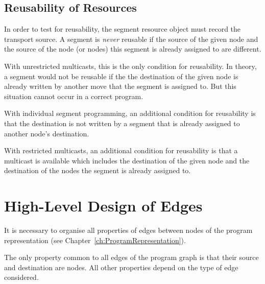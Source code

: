 \documentclass[a4paper,twoside]{tce}
\begin{document}
\subsection{Reusability of Resources}

In order to test for reusability, the segment resource object must record
the transport source. A segment is \emph{never} reusable if the source of
the given node and the source of the node (or nodes) this segment is already
assigned to are different.

With unrestricted multicasts, this is the only condition for reusability. In
theory, a segment would not be reusable if the the destination of the given
node is already written by another move that the segment is assigned to.
But this situation cannot occur in a correct program.

With individual segment programming, an additional condition for reusability
is that the destination is not written by a segment that is already assigned
to another node's destination.

With restricted multicasts, an additional condition for reusability is that
a multicast is available which includes the destination of the given node
and the destination of the nodes the segment is already assigned to.

\section{High-Level Design of Edges}
\label{ch:pending:edges}

It is necessary to organise all properties of edges between nodes of the
program representation (see Chapter~\ref{ch:ProgramRepresentation}).

The only property common to all edges of the program graph is that their
source and destination are nodes. All other properties depend on the type of
edge considered.
\end{document}
